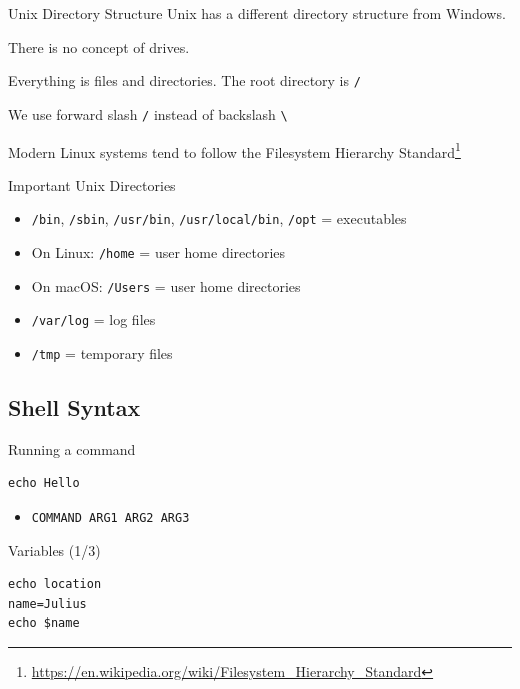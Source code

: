 \documentclass[12pt]{beamer}
\begin{document}
\begin{frame}{Unix Directory Structure}
  Unix has a different directory structure from Windows.

  There is no concept of drives.

  Everything is files and directories. The root directory is \texttt{/}

  We use forward slash \texttt{/} instead of backslash \texttt{\textbackslash}

  Modern Linux systems tend to follow the Filesystem Hierarchy Standard\footnote{\url{https://en.wikipedia.org/wiki/Filesystem_Hierarchy_Standard}}
\end{frame}

\begin{frame}{Important Unix Directories}
  \begin{itemize}
    \item \texttt{/bin}, \texttt{/sbin}, \texttt{/usr/bin}, \texttt{/usr/local/bin}, \texttt{/opt} = executables
    \item On Linux: \texttt{/home} = user home directories
    \item On macOS: \texttt{/Users} = user home directories
    \item \texttt{/var/log} = log files
    \item \texttt{/tmp} = temporary files
  \end{itemize}
\end{frame}

\subsection{Shell Syntax}
\begin{frame}[fragile]{Running a command}
  \begin{verbatim}
echo Hello
\end{verbatim}
  \begin{itemize}
    \item \texttt{COMMAND ARG1 ARG2 ARG3}
  \end{itemize}
\end{frame}

\begin{frame}[fragile]{Variables (1/3)}
  \begin{verbatim}
echo location
name=Julius
echo $name
\end{verbatim}
\end{frame}
\end{document}
